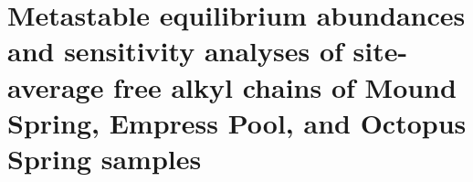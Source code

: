 \chapter{Metastable equilibrium abundances and sensitivity analyses of site-average free alkyl chains of Mound Spring, Empress Pool, and Octopus Spring samples}